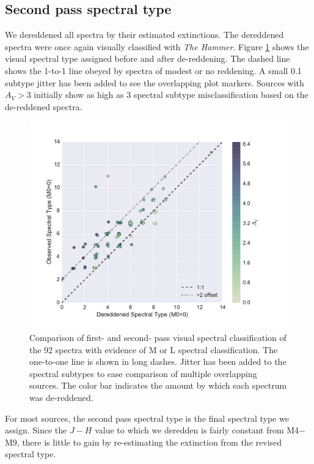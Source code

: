\subsection{Second pass spectral type}
We dereddened all spectra by their estimated extinctions.  The dereddened spectra were once again visually classified with \emph{The Hammer}.  Figure \ref{fig_dereddened_comparison} shows the visual spectral type assigned before and after de-reddening.  The dashed line shows the 1-to-1 line obeyed by spectra of modest or no reddening.  A small 0.1 subtype jitter has been added to see the overlapping plot markers.  Sources with $A_V >3 $ initially show as high as 3 spectral subtype misclassification based on the de-reddened spectra.

\begin{figure}[ht!]
\caption[Effect of reddening on spectral classification]{Comparison of first- and second- pass visual spectral classification of the 92 spectra with evidence of M or L spectral classification.  The one-to-one line is shown in long dashes.  Jitter has been added to the spectral subtypes to ease comparison of multiple overlapping sources.  The color bar indicates the amount by which each spectrum was de-reddened.  \label{fig_dereddened_comparison} }
\centering
\includegraphics[scale=0.5]{chIMACS/figures/dereddened_spt_comparison}
\end{figure}

For most sources, the second pass spectral type is the final spectral type we assign.  Since the $J-H$ value to which we deredden is fairly constant from M4$-$M9, there is little to gain by re-estimating the extinction from the revised spectral type.

